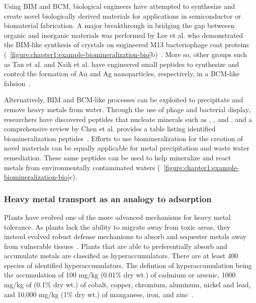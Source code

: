 \documentclass[../main/main]{subfiles}
\begin{document}
Using BIM and BCM, biological engineers have attempted to synthesize and create novel biologically derived materials for applications in semiconductor or biomaterial fabrication. A major breakthrough in bridging the gap betweeen organic and inorganic materials was performed by Lee et al. who demonstrated the BIM-like synthesis of  crystals on engineered M13 bacteriophage coat proteins (\FIGURE~\ref{figure:chapter1:example-biomineralization-bio}b)~\cite{lee2002ordering}. More so, other groups such as Tan et al. and Naik et al. have engineered small peptides to synthesize and control the formation of Au and Ag nanoparticles, respectively, in a BCM-like fahsion~\cite{tan2010uncovering,naik2002biomimetic}.

Alternatively, BIM and BCM-like processes can be exploited to precipitate and remove heavy metals from water. Through the use of phage and bacterial display, researchers have discovered peptides that nucleate minerals such as , , and , and a comprehensive review by Chen et al. provides a table listing identified biomineralization peptides~\cite{naik2002silica,dickerson2008identification,gungormus2008regulation,chen2010peptide}.
Efforts to use biomineralization for the creation of novel materials can be equally applicable for metal precipitation and waste water remediation. These same peptides can be used to help mineralize and react metals from environmentally contaminated waters (\FIGURE~\ref{figure:chapter1:example-biomineralization-bio}c).

\subsubsection*{Heavy metal transport as an analogy to adsorption}
Plants have evolved one of the more advanced mechanisms for heavy metal tolerance. As plants lack the ability to migrate away from toxic areas, they instead evolved robust defense mechanisms to absorb and sequester metals away from vulnerable tissues~\cite{hall2002cellular}. Plants that are able to preferentially absorb and accumulate metals are classified as hyperaccumulators. There are at least 400 species of identified hyperaccumulators. The defintion of hyperaccumulation being the accumulation of 100 mg/kg (0.01\% dry wt.) of cadmium or arsenic, 1000 mg/kg of (0.1\% dry wt.) of cobalt, copper, chromium, aluminum, nickel and lead, and 10,000 mg/kg (1\% dry wt.) of manganese, iron, and zinc~\cite{rascio2011heavy,vara2003metal,branquinho2007revisiting,kramer2010metal}.
\end{document}
